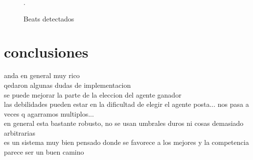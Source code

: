 \documentclass[12pt,a4paper,titlepage]{report}
\begin{document}
\begin{figure} [h!]
\centering
  \caption{Beats detectados}
  \label{fig:train11_beats}.
\end{figure}


\section{conclusiones}

anda en general muy rico\\

qedaron algunas dudas de implementacion\\

se puede mejorar la parte de la eleccion del agente ganador\\

las debilidades pueden estar en la dificultad de elegir el agente posta... nos pasa a veces q agarramos multiplos...\\

en general esta bastante robusto, no se usan umbrales duros ni cosas demasiado arbitrarias\\

es un sistema muy bien pensado donde se favorece a los mejores y la competencia parece ser un buen camino\\
\end{document}
